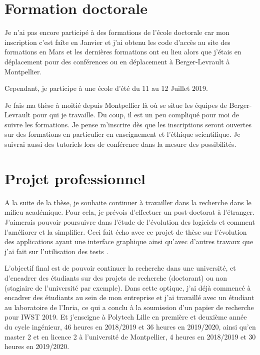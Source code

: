 \documentclass[a4paper]{article}
\begin{document}
\section{Formation doctorale}

Je n'ai pas encore participé à des formations de l'école doctorale car mon inscription c'est faîte en Janvier et j'ai obtenu les code d'accès au site des formations en Mars 
  et les dernières formations ont eu lieu alors que j'étais en déplacement pour des conférences ou en déplacement à Berger-Levrault à Montpellier.

Cependant, je participe à une école d'été du 11 au 12 Juillet 2019.

Je fais ma thèse à moitié depuis Montpellier là où se situe les équipes de Berger-Levrault pour qui je travaille. Du coup, il est un peu compliqué pour moi de suivre les formations. 
Je pense m'inscrire dès que les inscriptions seront ouvertes sur des formations en particulier en enseignement et l'éthique scientifique. 
Je suivrai aussi des tutoriels lors de conférence dans la mesure des possibilités.

\section{Projet professionnel}

A la suite de la thèse, je souhaite continuer à travailler dans la recherche dans le milieu académique.
Pour cela, je prévois d'effectuer un post-doctorat à l'étranger.
J'aimerais pouvoir poursuivre dans l'étude de l'évolution des logiciels et comment l'améliorer et la simplifier.
Ceci fait écho avec ce projet de thèse sur l'évolution des applications ayant une interface graphique
  ainsi qu'avec d'autres travaux que j'ai fait sur l'utilisation des tests \citep{Verh17a, Deme18a}.

L'objectif final est de pouvoir continuer la recherche dans une université,
  et d'encadrer des étudiants sur des projets de recherche (doctorant) ou non (stagiaire de l'université par exemple).
Dans cette optique, j'ai déjà commencé à encadrer des étudiants au sein de mon entreprise 
  et j'ai travaillé avec un étudiant au laboratoire de l'Inria, ce qui a conclu à la soumission d'un papier de recherche pour IWST 2019.
Et j'enseigne à Polytech Lille en première et deuxième année du cycle ingénieur, 46 heures en 2018/2019 et 36 heures en 2019/2020,
  ainsi qu'en master 2 et en licence 2 à l'université de Montpellier, 4 heures en 2018/2019 et 30 heures en 2019/2020. 


\footnotesize{
  
  
}
\end{document}
